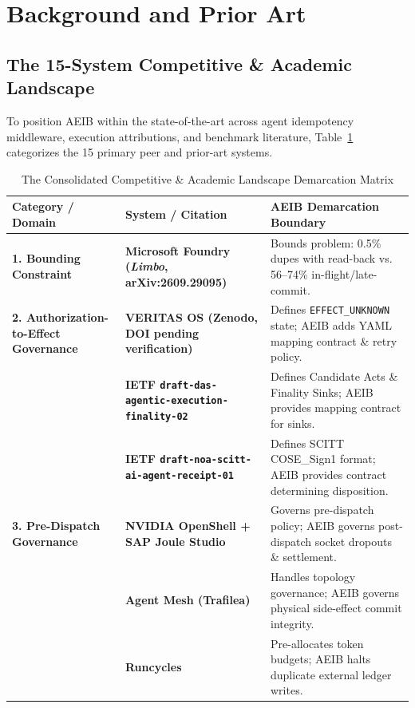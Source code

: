 \documentclass[10pt,journal,compsoc]{IEEEtran}
\begin{document}
\section{Background and Prior Art}

\subsection{The 15-System Competitive \& Academic Landscape}
To position AEIB within the state-of-the-art across agent idempotency middleware, execution attributions, and benchmark literature, Table~\ref{tab:landscape} categorizes the 15 primary peer and prior-art systems.

\begin{table}[t]
\centering
\caption{The Consolidated Competitive \& Academic Landscape Demarcation Matrix}
\label{tab:landscape}
\begin{tabular}{lll}
\toprule
\textbf{Category / Domain} & \textbf{System / Citation} & \textbf{AEIB Demarcation Boundary} \\
\midrule
\textbf{1. Bounding Constraint} & \textbf{Microsoft Foundry (\emph{Limbo}, arXiv:2609.29095)}~\cite{limbo2026} & Bounds problem: 0.5\% dupes with read-back vs. 56--74\% in-flight/late-commit. \\
\midrule
\textbf{2. Authorization-to-Effect Governance} & \textbf{VERITAS OS (Zenodo, DOI pending verification)}~\cite{veritas2026} & Defines \texttt{EFFECT\_UNKNOWN} state; AEIB adds YAML mapping contract \& retry policy. \\
 & \textbf{IETF \texttt{draft-das-agentic-execution-finality-02}}~\cite{das2026finality} & Defines Candidate Acts \& Finality Sinks; AEIB provides mapping contract for sinks. \\
 & \textbf{IETF \texttt{draft-noa-scitt-ai-agent-receipt-01}}~\cite{noa2026scitt} & Defines SCITT COSE\_Sign1 format; AEIB provides contract determining disposition. \\
\midrule
\textbf{3. Pre-Dispatch Governance} & \textbf{NVIDIA OpenShell + SAP Joule Studio}~\cite{openshell2026} & Governs pre-dispatch policy; AEIB governs post-dispatch socket dropouts \& settlement. \\
 & \textbf{Agent Mesh (Trafilea)}~\cite{agentmesh2026} & Handles topology governance; AEIB governs physical side-effect commit integrity. \\
 & \textbf{Runcycles}~\cite{runcycles2026} & Pre-allocates token budgets; AEIB halts duplicate external ledger writes. \\

\end{tabular}
\end{table}
\end{document}
